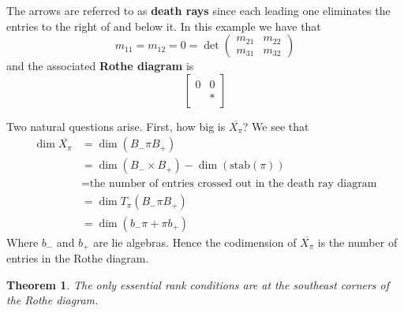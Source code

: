 \documentclass[12pt]{amsart}
\numberwithin{equation}{section}
\newtheorem{Theorem}[equation]{Theorem}
\theoremstyle{definition}
\numberwithin{figure}{section}
\begin{document}
\begin{center}
\end{center}
The arrows are referred to as \textbf{death rays} since each leading one eliminates the entries to the right of and below it. In this example we have that $$m_{11}=m_{12}=0=\det\left ( \begin{array}{cc} m_{21} & m_{22} \\ m_{31} & m_{32}  \end{array}\right )$$ and the associated \textbf{Rothe diagram} is $$\left [ \begin{array}{cc} 0 & 0 \\ & *\end{array}\right ]$$

Two natural questions arise. First, how big is $\overline{X_\pi}$? We see that \begin{align*}
\dim\overline{X_\pi}&=\dim(B_-\pi B_+) \\
&= \dim(B_-\times B_+)-\dim(\text{stab}(\pi))\\
&=\text{the number of entries crossed out in the death ray diagram}\\
&=\dim T_\pi(B_-\pi B_+)\\
&=\dim(b_-\pi+\pi b_+)
\end{align*}
Where $b_-$ and $b_+$ are lie algebras. Hence the codimension of $\overline{X_\pi}$ is the number of entries in the Rothe diagram.

\begin{Theorem}
The only essential rank conditions are at the southeast corners of the Rothe diagram.
\end{Theorem}
\end{document}
